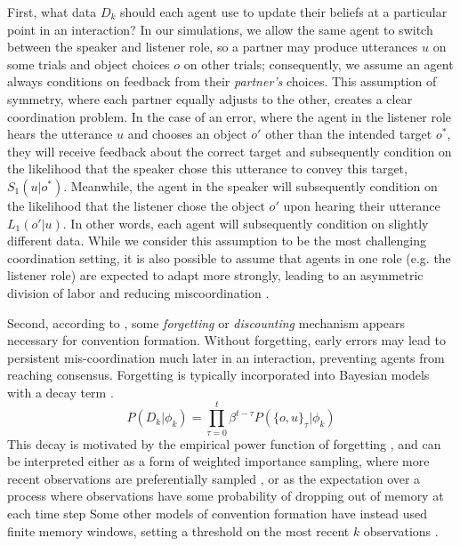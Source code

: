First, what data $D_k$ should each agent use to update their beliefs at a particular point in an interaction?
In our simulations, we allow the same agent to switch between the speaker and listener role, so a partner may produce utterances $u$ on some trials and object choices $o$ on other trials; consequently, we assume an agent always conditions on feedback from their \emph{partner's} choices.
This assumption of symmetry, where each partner equally adjusts to the other, creates a clear coordination problem. 
In the case of an error, where the agent in the listener role hears the utterance $u$ and chooses an object $o'$ other than the intended target $o^*$, they will receive feedback about the correct target and subsequently condition on the likelihood that the speaker chose this utterance to convey this target, $S_1(u | o^*)$. 
Meanwhile, the agent in the speaker will subsequently condition on the likelihood that the listener chose the object $o'$ upon hearing their utterance $L_1(o' | u)$.
In other words, each agent will subsequently condition on slightly different data.
While we consider this assumption to be the most challenging coordination setting, it is also possible to assume that agents in one role (e.g. the listener role) are expected to adapt more strongly, leading to an asymmetric division of labor and reducing miscoordination \cite{MorenoBaggio14_AsymmetrySignaling}.

Second, according to , some \emph{forgetting} or \emph{discounting} mechanism appears necessary for convention formation. 
Without forgetting, early errors may lead to persistent mis-coordination much later in an interaction, preventing agents from reaching consensus.
Forgetting is typically incorporated into Bayesian models with a decay term \cite{anderson2000adaptive,angela2009sequential,fudenberg2014recency,kalm2018visual}.
$$P(D_k | \phi_k) = \prod_{\tau=0}^t \beta^{t-\tau} P(\{o,u\}_\tau | \phi_k)$$
This decay is motivated by the empirical power function of forgetting \cite{wixted1991form}, and can be interpreted either as a form of weighted importance sampling, where more recent observations are preferentially sampled \cite{pearl2010online}, or as the expectation over a process where observations have some probability of dropping out of memory at each time step 
Some other models of convention formation have instead used finite memory windows, setting a threshold on the most recent $k$ observations \cite{young_evolution_2015}.


